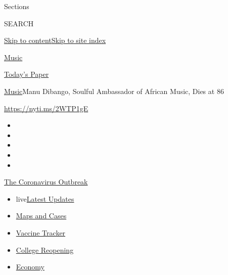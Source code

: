 Sections

SEARCH

\protect\hyperlink{site-content}{Skip to
content}\protect\hyperlink{site-index}{Skip to site index}

\href{https://www.nytimes3xbfgragh.onion/section/arts/music}{Music}

\href{https://myaccount.nytimes3xbfgragh.onion/auth/login?response_type=cookie\&client_id=vi}{}

\href{https://www.nytimes3xbfgragh.onion/section/todayspaper}{Today's
Paper}

\href{/section/arts/music}{Music}\textbar{}Manu Dibango, Soulful
Ambassador of African Music, Dies at 86

\url{https://nyti.ms/2WTP1gE}

\begin{itemize}
\item
\item
\item
\item
\item
\end{itemize}

\href{https://www.nytimes3xbfgragh.onion/news-event/coronavirus?action=click\&pgtype=Article\&state=default\&region=TOP_BANNER\&context=storylines_menu}{The
Coronavirus Outbreak}

\begin{itemize}
\tightlist
\item
  live\href{https://www.nytimes3xbfgragh.onion/2020/08/04/world/coronavirus-covid-19.html?action=click\&pgtype=Article\&state=default\&region=TOP_BANNER\&context=storylines_menu}{Latest
  Updates}
\item
  \href{https://www.nytimes3xbfgragh.onion/interactive/2020/us/coronavirus-us-cases.html?action=click\&pgtype=Article\&state=default\&region=TOP_BANNER\&context=storylines_menu}{Maps
  and Cases}
\item
  \href{https://www.nytimes3xbfgragh.onion/interactive/2020/science/coronavirus-vaccine-tracker.html?action=click\&pgtype=Article\&state=default\&region=TOP_BANNER\&context=storylines_menu}{Vaccine
  Tracker}
\item
  \href{https://www.nytimes3xbfgragh.onion/2020/08/02/us/covid-college-reopening.html?action=click\&pgtype=Article\&state=default\&region=TOP_BANNER\&context=storylines_menu}{College
  Reopening}
\item
  \href{https://www.nytimes3xbfgragh.onion/live/2020/08/03/business/stock-market-today-coronavirus?action=click\&pgtype=Article\&state=default\&region=TOP_BANNER\&context=storylines_menu}{Economy}
\end{itemize}

